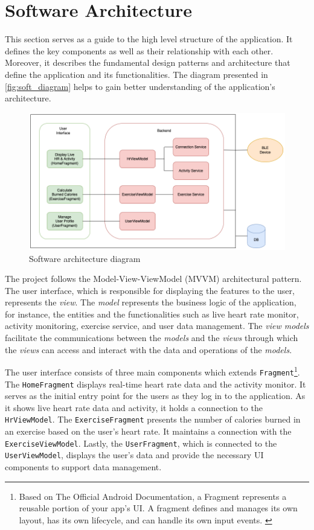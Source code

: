 \section{Software Architecture}
This section serves as a guide to the high level structure of the application. It defines the key components as well as their relationship with each other.
Moreover, it describes the fundamental design patterns and architecture that define the application and its functionalities. 
The diagram presented in \autoref{fig:soft_diagram} helps to gain better understanding of the application's architecture.
\begin{figure}[H]
    \centering
    \includegraphics[width=1\textwidth]{diagrams/architecture-diagram.drawio.png}
    \caption{Software architecture diagram}
    \label{fig:soft_diagram}
\end{figure}
The project follows the Model-View-ViewModel (MVVM) architectural pattern. The user interface, which is responsible for displaying the features to the user, represents the \emph{view}. 
The \emph{model} represents the business logic of the application, for instance, the entities and the functionalities such as live heart rate monitor, activity monitoring, exercise service, and user data management. 
The \emph{view models} facilitate the communications between the \emph{models} and the \emph{views} through which the \emph{views} can access and interact with the data and operations of the \emph{models}.

The user interface consists of three main components which extends \texttt{Fragment}\footnote{Based on The Official Android Documentation, a Fragment represents a reusable portion of your app's UI. A fragment defines and manages its own layout, has its own lifecycle, and can handle its own input events. \autocite{android-fragments}}. 
The \texttt{HomeFragment} displays real-time heart rate data and the activity monitor. It serves as the initial entry point for the users as they log in to the application. As it shows live heart rate data and activity, it holds a connection to the \texttt{HrViewModel}.
The \texttt{ExerciseFragment} presents the number of calories burned in an exercise based on the user's heart rate. It maintains a connection with the \texttt{ExerciseViewModel}. Lastly, the \texttt{UserFragment}, which is connected to the \texttt{UserViewModel}, displays the user's data and provide the necessary UI components to support data management.

